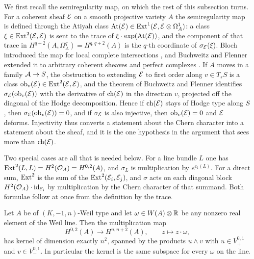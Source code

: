 We first recall the semiregularity map, on which the rest of this subsection
turns. For a coherent sheaf $\mathcal{E}$ on a smooth projective variety $A$ the semiregularity
map is defined through the Atiyah class
$\mathrm{At}(\mathcal{E})\in\operatorname{Ext}^{1}(\mathcal{E},\mathcal{E}\otimes\Omega^{1}_{A})$: a class
$\xi\in\operatorname{Ext}^{2}(\mathcal{E},\mathcal{E})$ is sent to the trace of
$\xi\cdot\exp(\mathrm{At}(\mathcal{E}))$, and the component of that trace in
$H^{q+2}(A,\Omega^{q}_{A})=H^{q,q+2}(A)$ is the $q$-th coordinate of
$\sigma_{\mathcal{E}}(\xi)$. Bloch introduced the map for local complete
intersections \cite{Blo72}, and Buchweitz and Flenner extended it to
arbitrary coherent sheaves and perfect complexes \cite{BF03}. If $A$ moves in
a family $\mathcal{A}\to S$, the obstruction to extending $\mathcal{E}$ to first order along
$v\in T_{s}S$ is a class $\mathrm{ob}_{v}(\mathcal{E})\in\operatorname{Ext}^{2}(\mathcal{E},\mathcal{E})$, and the
theorem of Buchweitz and Flenner identifies $\sigma_{\mathcal{E}}(\mathrm{ob}_{v}(\mathcal{E}))$
with the derivative of $\operatorname{ch}(\mathcal{E})$ in the direction $v$, projected off the
diagonal of the Hodge decomposition. Hence if $\operatorname{ch}(\mathcal{E})$ stays of Hodge type
along $S$, then $\sigma_{\mathcal{E}}(\mathrm{ob}_{v}(\mathcal{E}))=0$, and if $\sigma_{\mathcal{E}}$ is
also injective, then $\mathrm{ob}_{v}(\mathcal{E})=0$ and $\mathcal{E}$ deforms.
Injectivity thus converts a statement about the Chern character into a
statement about the sheaf, and it is the one hypothesis in the argument that
sees more than $\operatorname{ch}(\mathcal{E})$.

Two special cases are all that is needed below. For a line bundle $L$ one has
$\operatorname{Ext}^{2}(L,L)=H^{2}(\mathcal{O}_{A})=H^{0,2}(A)$, and $\sigma_{L}$ is multiplication
by $e^{c_{1}(L)}$. For a direct sum, $\operatorname{Ext}^{2}$ is the sum of the
$\operatorname{Ext}^{2}(\mathcal{E}_{i},\mathcal{E}_{j})$, and $\sigma$ acts on each diagonal block
$H^{2}(\mathcal{O}_{A})\cdot\operatorname{id}_{\mathcal{E}_{i}}$ by multiplication by the Chern character of
that summand. Both formulae follow at once from the definition by the trace.

\begin{lemma}
\label{lem:annihilator}
Let $A$ be of $(K,-1,n)$-Weil type and let $\omega\in W(A)\otimes\mathbb{R}$ be
any nonzero real element of the Weil line. Then the multiplication map
\[
  H^{0,2}(A)\longrightarrow H^{n,n+2}(A),\qquad z\longmapsto z\cdot\omega,
\]
has kernel of dimension exactly $n^{2}$, spanned by the products $u\wedge v$
with $u\in V_{+}^{0,1}$ and $v\in V_{-}^{0,1}$. In particular the kernel is
the same subspace for every $\omega$ on the line.
\end{lemma}

